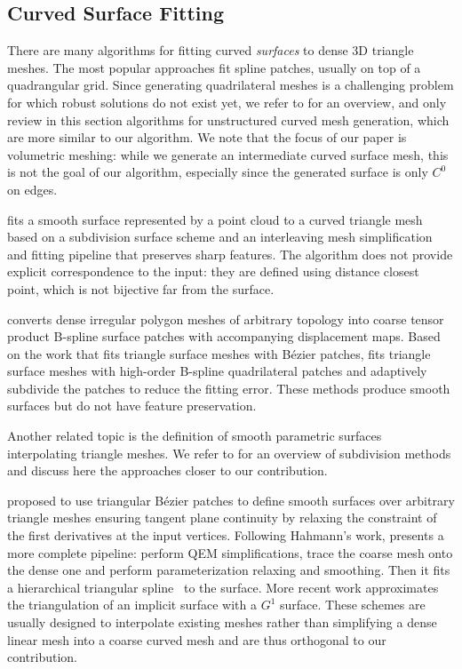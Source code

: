 \subsection{Curved Surface Fitting}
There are many algorithms for fitting curved \emph{surfaces} to dense 3D triangle meshes. The most popular approaches fit spline patches, usually on top of a quadrangular grid. Since generating quadrilateral meshes is a challenging problem for which robust solutions do not exist yet, we refer to \cite{QUADSTAR2012} for an overview, and only review in this section algorithms for unstructured curve{d} mesh generation, which are more similar to our algorithm. We note that the focus of our paper is volumetric meshing: while we generate an intermediate curved surface mesh, this is not the goal of our algorithm, especially since the generated surface is only $C^0$ on edges.

\cite{hoppe1994piecewise} fits a smooth surface represented by a point cloud to a curved triangle mesh based on a subdivision surface scheme and an interleaving mesh simplification and fitting pipeline that preserves sharp features. 
The algorithm does not provide explicit correspondence to the input: they are defined using distance closest point, which is not bijective far from the surface. 

\cite{krishnamurthy1996fitting} converts dense irregular polygon meshes of arbitrary topology into coarse tensor product B-spline surface patches with accompanying displacement maps. Based on the work \cite{LIN2007adap} that fits triangle surface meshes with B\'ezier patches, \cite{Zhang2011multi} fits triangle surface meshes with high-order B-spline quadrilateral patches and adaptively subdivide the patches to reduce the fitting error. These methods produce smooth surfaces but do not have feature preservation.

Another related topic is the definition of smooth parametric surfaces interpolating triangle meshes. We refer to \cite{zorin2000subdivision} for an overview of subdivision methods and discuss here the approaches closer to our contribution.

\cite{Hahmann2003} proposed to use triangular B\'ezier patches to define smooth surfaces over arbitrary triangle meshes ensuring tangent plane continuity by relaxing the constraint of the first derivatives at the input vertices.
%
Following Hahmann's work, \cite{yvart2005smooth} presents a more complete pipeline: perform QEM simplifications, trace the coarse mesh onto the dense one and perform parameterization relaxing and smoothing. Then it fits a hierarchical triangular spline~\cite{Yvart2005hier} to the surface.
%
More recent work \cite{TONG2009} approximates the triangulation of an implicit surface with a $G^1$ surface.
%
These schemes are usually designed to interpolate existing meshes rather than simplifying a dense linear mesh into a coarse curved mesh and are thus orthogonal to our contribution.



